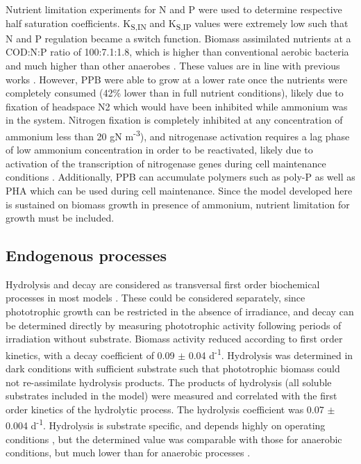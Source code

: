 Nutrient limitation experiments for N and P were used to determine respective half saturation coefficients. K\textsubscript{S,IN} and K\textsubscript{S,IP} values were extremely low such that N and P regulation became a switch function. Biomass assimilated nutrients at a COD:N:P ratio of 100:7.1:1.8, which is higher than conventional aerobic bacteria and much higher than other anaerobes \cite{Tchobanoglous}. These values are in line with previous works \cite{Hulsen2014}. However, PPB were able to grow at a lower rate once the nutrients were completely consumed (42\% lower than in full nutrient conditions), likely due to fixation of headspace N2 \cite{Hunter2008} which would have been inhibited while ammonium was in the system. Nitrogen fixation is completely inhibited at any concentration of ammonium less than 20 gN m\textsuperscript{-3}), and nitrogenase activation requires a lag phase of low ammonium concentration in order to be reactivated, likely due to activation of the transcription of nitrogenase genes during cell maintenance conditions \cite{Masepohl2002}. Additionally, PPB can accumulate polymers such as poly-P \cite{Liang2010} as well as PHA \cite{Melnicki2009} which can be used during cell maintenance. Since the model developed here is sustained on biomass growth in presence of ammonium, nutrient limitation for growth must be included.

\subsection{Endogenous processes}
Hydrolysis and decay are considered as transversal first order biochemical processes in most models \cite{Batstone2006, Henze2000, Szilvester2010}. These could be considered separately, since phototrophic growth can be restricted in the absence of irradiance, and decay can be determined directly by measuring phototrophic activity following periods of irradiation without substrate. Biomass activity reduced according to first order kinetics, with a decay coefficient of \num{0.09} $\pm$ \num{0.04} d\textsuperscript{-1}. Hydrolysis was determined in dark conditions with sufficient substrate such that phototrophic biomass could not re-assimilate hydrolysis products. The products of hydrolysis (all soluble substrates included in the model) were measured and correlated with the first order kinetics of the hydrolytic process. The hydrolysis coefficient was \num{0.07} $\pm$ \num{0.004} d\textsuperscript{-1}. Hydrolysis is substrate specific, and depends highly on operating conditions \cite{Batstone2015}, but the determined value was comparable with those for anaerobic conditions, but much lower than for anaerobic processes \cite{Henze2000}. 

